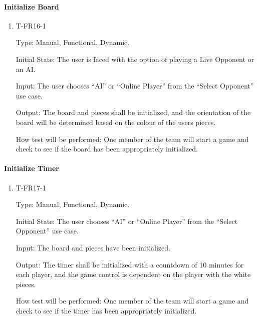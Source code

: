 \documentclass[12pt, titlepage]{article}
\begin{document}
    \paragraph{Initialize Board}

        \begin{enumerate}

        \item{T-FR16-1\\}

            Type: Manual, Functional, Dynamic.
            					
            Initial State: The user is faced with the option of playing a Live Opponent or an AI.
            					
            Input: The user chooses ``AI'' or ``Online Player'' from the ``Select Opponent'' use case.
            					
            Output: The board and pieces shall be initialized, and the orientation of the board will be determined
            based on the colour of the users pieces.

            How test will be performed: One member of the team will start a game and check to see if the board has been appropriately initialized.

        \end{enumerate}

    \paragraph{Initialize Timer}

        \begin{enumerate}

        \item{T-FR17-1\\}

            Type: Manual, Functional, Dynamic.
            					
            Initial State: The user chooses ``AI'' or ``Online Player'' from the ``Select Opponent'' use case.
            					
            Input: The board and pieces have been initialized.
            					
            Output: The timer shall be initialized with a countdown of 10 minutes for each player, and the game control is dependent on the player with the white pieces.

            How test will be performed: One member of the team will start a game and check to see if the timer has been appropriately initialized.

        \end{enumerate}
\end{document}
